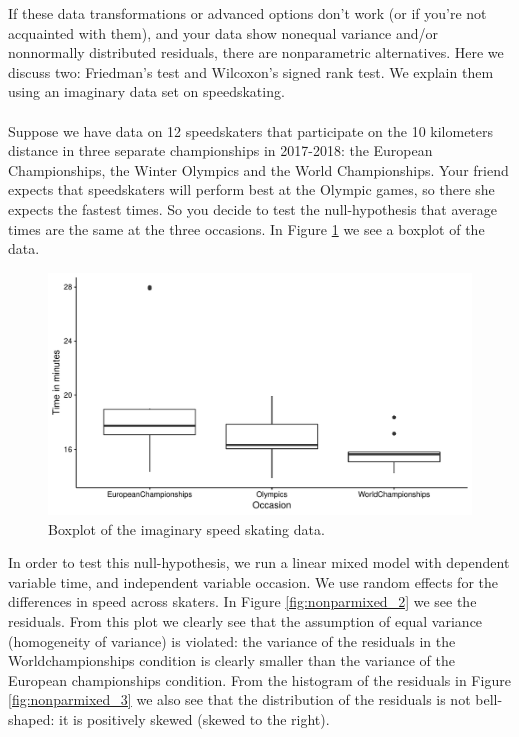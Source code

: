 \documentclass[]{book}\usepackage[]{graphicx}\usepackage[]{color}
\makeatletter
\def\maxwidth{ %
  \ifdim\Gin@nat@width>\linewidth
    \linewidth
  \else
    \Gin@nat@width
  \fi
}
\newenvironment{knitrout}{}{} %
\makeatother
\begin{document}
If these data transformations or advanced options don't work (or if you're not acquainted with them), and your data show nonequal variance and/or nonnormally distributed residuals, there are nonparametric alternatives.  Here we discuss two: Friedman's test and Wilcoxon's signed rank test. We explain them using an imaginary data set on speedskating.
\\
\\
Suppose we have data on 12 speedskaters that participate on the 10 kilometers distance in three separate championships in 2017-2018: the European Championships, the Winter Olympics and the World Championships. Your friend expects that speedskaters will perform best at the Olympic games, so there she expects the fastest times. So you decide to test the null-hypothesis that average times are the same at the three occasions. In Figure \ref{fig:nonparmixed_1} we see a boxplot of the data.



\begin{knitrout}
\color{fgcolor}\begin{figure}

{\centering \includegraphics[width=\maxwidth]{figure/nonparmixed_1-1} 

}

\caption[Boxplot of the imaginary speed skating data]{Boxplot of the imaginary speed skating data.}\label{fig:nonparmixed_1}
\end{figure}


\end{knitrout}

In order to test this null-hypothesis, we run a linear mixed model with dependent variable time, and independent variable occasion. We use random effects for the differences in speed across skaters. In Figure \ref{fig:nonparmixed_2} we see the residuals. From this plot we clearly see that the assumption of equal variance (homogeneity of variance) is violated: the variance of the residuals in the Worldchampionships condition is clearly smaller than the variance of the European championships condition. From the histogram of the residuals in Figure \ref{fig:nonparmixed_3} we also see that the distribution of the residuals is not bell-shaped: it is positively skewed (skewed to the right).
\end{document}
